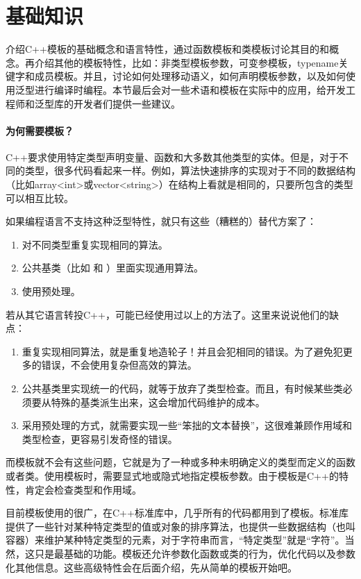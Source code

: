 \part{基础知识}

介绍C++模板的基础概念和语言特性，通过函数模板和类模板讨论其目的和概念。再介绍其他的模板特性，比如：非类型模板参数，可变参模板，typename关键字和成员模板。并且，讨论如何处理移动语义，如何声明模板参数，以及如何使用泛型进行编译时编程。本节最后会对一些术语和模板在实际中的应用，给开发工程师和泛型库的开发者们提供一些建议。

\subsection*{为何需要模板？}

C++要求使用特定类型声明变量、函数和大多数其他类型的实体。但是，对于不同的类型，很多代码看起来一样。例如，算法快速排序的实现对于不同的数据结构（比如array<int>或vector<string>）在结构上看就是相同的，只要所包含的类型可以相互比较。

如果编程语言不支持这种泛型特性，就只有这些（糟糕的）替代方案了：

\begin{enumerate}
  \item 对不同类型重复实现相同的算法。
  \item 公共基类（比如  和 ）里面实现通用算法。
  \item 使用预处理。
\end{enumerate}

若从其它语言转投C++，可能已经使用过以上的方法了。这里来说说他们的缺点：

\begin{enumerate}
  \item 重复实现相同算法，就是重复地造轮子！并且会犯相同的错误。为了避免犯更多的错误，不会使用复杂但高效的算法。

  \item 公共基类里实现统一的代码，就等于放弃了类型检查。而且，有时候某些类必须要从特殊的基类派生出来，这会增加代码维护的成本。

  \item 采用预处理的方式，就需要实现一些“笨拙的文本替换”，这很难兼顾作用域和类型检查，更容易引发奇怪的错误。
\end{enumerate}

而模板就不会有这些问题，它就是为了一种或多种未明确定义的类型而定义的函数或者类。使用模板时，需要显式地或隐式地指定模板参数。由于模板是C++的特性，肯定会检查类型和作用域。

目前模板使用的很广，在C++标准库中，几乎所有的代码都用到了模板。标准库提供了一些针对某种特定类型的值或对象的排序算法，也提供一些数据结构（也叫容器）来维护某种特定类型的元素，对于字符串而言，“特定类型”就是“字符”。当然，这只是最基础的功能。模板还允许参数化函数或类的行为，优化代码以及参数化其他信息。这些高级特性会在后面介绍，先从简单的模板开始吧。












